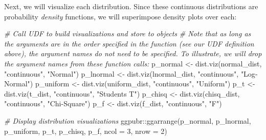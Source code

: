 \documentclass[
]{book}
\newenvironment{Shaded}{\begin{snugshade}}{\end{snugshade}}
\newcommand{\AttributeTok}[1]{\textcolor[rgb]{0.77,0.63,0.00}{#1}}
\newcommand{\CommentTok}[1]{\textcolor[rgb]{0.56,0.35,0.01}{\textit{#1}}}
\newcommand{\DecValTok}[1]{\textcolor[rgb]{0.00,0.00,0.81}{#1}}
\newcommand{\FunctionTok}[1]{\textcolor[rgb]{0.00,0.00,0.00}{#1}}
\newcommand{\NormalTok}[1]{#1}
\newcommand{\OtherTok}[1]{\textcolor[rgb]{0.56,0.35,0.01}{#1}}
\newcommand{\SpecialCharTok}[1]{\textcolor[rgb]{0.00,0.00,0.00}{#1}}
\newcommand{\StringTok}[1]{\textcolor[rgb]{0.31,0.60,0.02}{#1}}
\begin{document}
Next, we will visualize each distribution. Since these continuous distributions are probability \emph{density} functions, we will superimpose density plots over each:

\begin{Shaded}
\begin{Highlighting}[]
\CommentTok{\# Call UDF to build visualizations and store to objects}
\CommentTok{\# Note that as long as the arguments are in the order specified in the function (see our UDF definition above), the argument names do not need to be specified. To illustrate, we will drop the argument names from these function calls:}
\NormalTok{p\_normal }\OtherTok{\textless{}{-}} \FunctionTok{dist.viz}\NormalTok{(normal\_dist, }\StringTok{"continuous"}\NormalTok{, }\StringTok{"Normal"}\NormalTok{)}
\NormalTok{p\_lnormal }\OtherTok{\textless{}{-}} \FunctionTok{dist.viz}\NormalTok{(lnormal\_dist, }\StringTok{"continuous"}\NormalTok{, }\StringTok{"Log{-}Normal"}\NormalTok{)}
\NormalTok{p\_uniform }\OtherTok{\textless{}{-}} \FunctionTok{dist.viz}\NormalTok{(uniform\_dist, }\StringTok{"continuous"}\NormalTok{, }\StringTok{"Uniform"}\NormalTok{)}
\NormalTok{p\_t }\OtherTok{\textless{}{-}} \FunctionTok{dist.viz}\NormalTok{(t\_dist, }\StringTok{"continuous"}\NormalTok{, }\StringTok{"Student\textquotesingle{}s T"}\NormalTok{)}
\NormalTok{p\_chisq }\OtherTok{\textless{}{-}} \FunctionTok{dist.viz}\NormalTok{(chisq\_dist, }\StringTok{"continuous"}\NormalTok{, }\StringTok{"Chi{-}Square"}\NormalTok{)}
\NormalTok{p\_f }\OtherTok{\textless{}{-}} \FunctionTok{dist.viz}\NormalTok{(f\_dist, }\StringTok{"continuous"}\NormalTok{, }\StringTok{"F"}\NormalTok{)}

\CommentTok{\# Display distribution visualizations}
\NormalTok{ggpubr}\SpecialCharTok{::}\FunctionTok{ggarrange}\NormalTok{(p\_normal, p\_lnormal, p\_uniform, p\_t, p\_chisq, p\_f,}
          \AttributeTok{ncol =} \DecValTok{3}\NormalTok{, }\AttributeTok{nrow =} \DecValTok{2}\NormalTok{)}
\end{Highlighting}
\end{Shaded}
\end{document}
